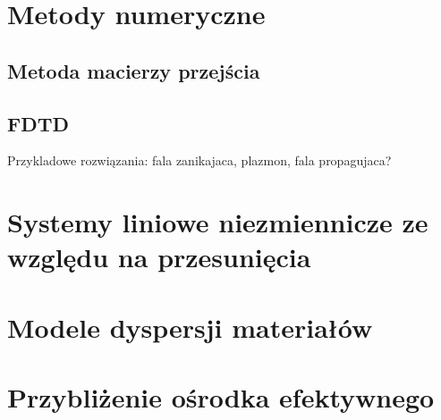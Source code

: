 \section{Metody numeryczne}
\subsection{Metoda macierzy przejścia}

\subsection{FDTD}

Przykladowe rozwiązania: fala zanikajaca, plazmon, fala propagujaca?
\section{Systemy liniowe niezmiennicze ze względu na przesunięcia}

\section{Modele dyspersji materiałów}

\section{Przybliżenie ośrodka efektywnego}


